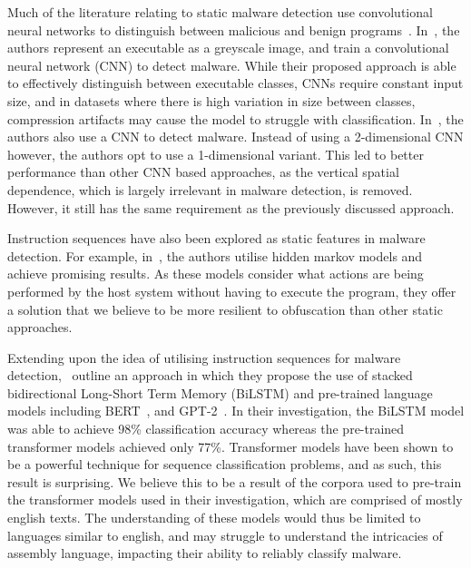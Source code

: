 \documentclass{report}
\begin{document}
Much of the literature relating to static malware detection use convolutional neural networks to distinguish between malicious and benign programs~\citep{niMalwareIdentificationUsing2018,jainConvolutionalNeuralNetworks2020,habibiPerformanceEvaluationCNN2023}. In~\cite{aslanNewMalwareClassification2021}, the authors represent an executable as a greyscale image, and train a convolutional neural network (CNN) to detect malware. While their proposed approach is able to effectively distinguish between executable classes, CNNs require constant input size, and in datasets where there is high variation in size between classes, compression artifacts may cause the model to struggle with classification. In~\cite{sharmaMalwareDetectionUsing2019}, the authors also use a CNN to detect malware. Instead of using a 2-dimensional CNN however, the authors opt to use a 1-dimensional variant. This led to better performance than other CNN based approaches, as the vertical spatial dependence, which is largely irrelevant in malware detection, is removed. However, it still has the same requirement as the previously discussed approach. 

Instruction sequences have also been explored as static features in malware detection. For example, in~\citep{attaluriProfileHiddenMarkov2009,runwalOpcodeGraphSimilarity2012}, the authors utilise hidden markov models and achieve promising results. As these models consider what actions are being performed by the host system without having to execute the program, they offer a solution that we believe to be more resilient to obfuscation than other static approaches. 

Extending upon the idea of utilising instruction sequences for malware detection,~\citep{demirciStaticMalwareDetection2022} outline an approach in which they propose the use of stacked bidirectional Long-Short Term Memory (BiLSTM) and pre-trained language models including BERT~\citep{devlinBERTPretrainingDeep2019a}, and GPT-2~\citep{radfordLanguageModelsArea}. In their investigation, the BiLSTM model was able to achieve 98\% classification accuracy whereas the pre-trained transformer models achieved only 77\%. Transformer models have been shown to be a powerful technique for sequence classification problems, and as such, this result is surprising. We believe this to be a result of the corpora used to pre-train the transformer models used in their investigation, which are comprised of mostly english texts. The understanding of these models would thus be limited to languages similar to english, and may struggle to understand the intricacies of assembly language, impacting their ability to reliably classify malware. 
\end{document}
